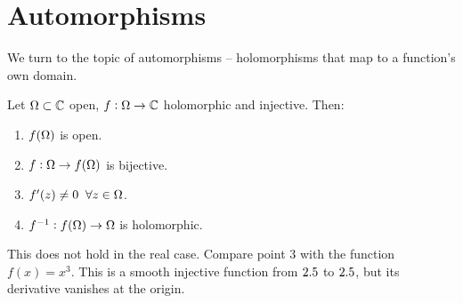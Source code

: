 \section{Automorphisms}

We turn to the topic of automorphisms -- holomorphisms that map to a function's own domain.

\begin{theorem}\label{thm:auto-prelim}
Let $\Omega \subset \mathbb{C}$ open, $f:\Omega \rightarrow \mathbb{C}$ holomorphic and injective. Then:
\begin{enumerate}
    \item $f(\Omega)$ is open.
    \item $f:\Omega \to f(\Omega)$ is bijective.
    \item $f'(z) \neq 0 \; \; \forall z \in \Omega$.
    \item $f^{-1}: f(\Omega) \to \Omega$ is holomorphic.
\end{enumerate}

\end{theorem}

\begin{note}
This does not hold in the real case. Compare point 3 with the function $f(x) = x^3$. This is a smooth injective function from $2.5$ to $2.5$, but its derivative vanishes at the origin.
\end{note}


